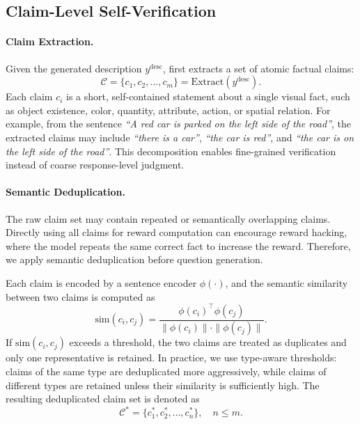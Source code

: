 \subsection{Claim-Level Self-Verification}
\label{sec:claim_level_verification}

\paragraph{Claim Extraction.}
Given the generated description $y^{\mathrm{desc}}$, \ours first extracts a set
of atomic factual claims:
\begin{equation}
    \mathcal{C}
    =
    \{c_1,c_2,\ldots,c_m\}
    =
    \mathrm{Extract}(y^{\mathrm{desc}}).
\end{equation}
Each claim $c_i$ is a short, self-contained statement about a single visual
fact, such as object existence, color, quantity, attribute, action, or spatial
relation. For example, from the sentence
\textit{``A red car is parked on the left side of the road''}, the extracted
claims may include \textit{``there is a car''}, \textit{``the car is red''}, and
\textit{``the car is on the left side of the road''}. This decomposition enables
fine-grained verification instead of coarse response-level judgment.

\paragraph{Semantic Deduplication.}
The raw claim set may contain repeated or semantically overlapping claims.
Directly using all claims for reward computation can encourage reward hacking,
where the model repeats the same correct fact to increase the reward. Therefore,
we apply semantic deduplication before question generation.

Each claim is encoded by a sentence encoder $\phi(\cdot)$, and the semantic
similarity between two claims is computed as
\begin{equation}
    \mathrm{sim}(c_i,c_j)
    =
    \frac{
    \phi(c_i)^\top \phi(c_j)
    }{
    \|\phi(c_i)\|\cdot\|\phi(c_j)\|
    }.
\end{equation}
If $\mathrm{sim}(c_i,c_j)$ exceeds a threshold, the two claims are treated as
duplicates and only one representative is retained. In practice, we use
type-aware thresholds: claims of the same type are deduplicated more
aggressively, while claims of different types are retained unless their
similarity is sufficiently high. The resulting deduplicated claim set is denoted
as
\begin{equation}
    \mathcal{C}^{\ast}
    =
    \{c_1^{\ast},c_2^{\ast},\ldots,c_n^{\ast}\},
    \quad n\leq m.
\end{equation}

